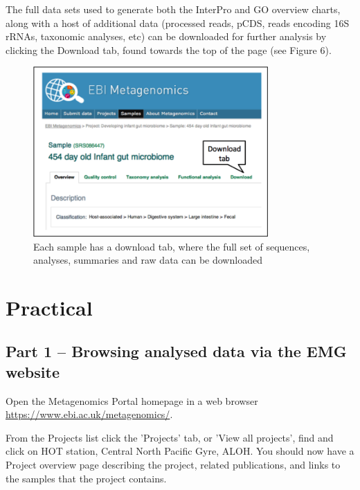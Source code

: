 The full data sets used to generate both the InterPro and GO overview charts, along with a host of additional data (processed reads, pCDS, reads encoding 16S rRNAs, taxonomic analyses, etc) can be downloaded for further analysis by clicking the Download tab, found towards the top of the page (see Figure 6).

\begin{figure}[Figure 6]
\centering
\includegraphics[width=0.8\textwidth]{handout/FA_DL.png}
\caption{Each sample has a download tab, where the full set of sequences, analyses, summaries and raw data can be downloaded}
\label{fig:FA_DL}
\end{figure}

\section{Practical}

\subsection{Part 1 – Browsing analysed data via the EMG website}

\begin{steps}
Open the Metagenomics Portal homepage in a web browser \url{https://www.ebi.ac.uk/metagenomics/}.

From the Projects list click the 'Projects' tab, or 'View all projects', find and click on HOT station, Central North Pacific Gyre, ALOH.
You should now have a Project overview page describing the project, related publications, and links to the samples that the project contains.
\end{steps}

